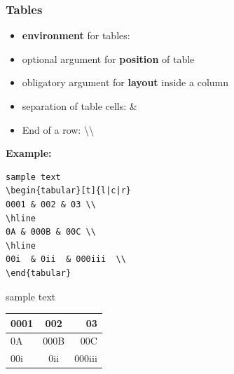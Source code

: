 \begin{frame}[fragile]
\frametitle{Tables}

\begin{itemize}
	\item \textbf{environment} for tables:  
	\item optional argument for \textbf{position} of table
	\item obligatory argument for \textbf{layout} inside a column
	\item separation of table cells: \& 
	\item End of a row: \textbackslash\textbackslash 
\end{itemize}


\pause 

\textbf{Example:}

\begin{multicols}{2}
	
\begin{lstlisting}
sample text	
\begin{tabular}[t]{l|c|r}
0001 & 002 & 03 \\
\hline
0A & 000B & 00C \\
\hline
00i  & 0ii  & 000iii  \\
\end{tabular}
\end{lstlisting}
	
	\columnbreak
	
sample text	
	\begin{tabular}[t]{l|c|r}
		0001 & 002 & 03 \\
		\hline
		0A & 000B & 00C \\
		\hline
		00i  & 0ii  & 000iii  \\
	\end{tabular}
\end{multicols}

\end{frame}


